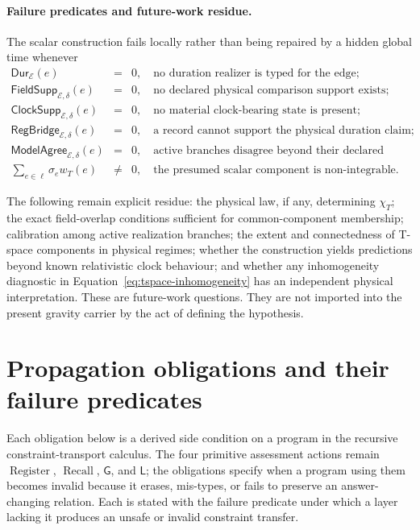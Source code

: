 \documentclass[11pt]{article}
\newcommand{\Register}{\ensuremath{\operatorname{Register}}}
\newcommand{\Recall}{\ensuremath{\operatorname{Recall}}}
\newcommand{\GOp}{\ensuremath{\mathsf{G}}}
\newcommand{\LOp}{\ensuremath{\mathsf{L}}}
\theoremstyle{definition}
\begin{document}
\paragraph{Failure predicates and future-work residue.}
The scalar construction fails locally rather than being repaired by a hidden global
time whenever
\begin{equation}
\begin{array}{rcl}
\mathsf{Dur}_{\mathcal E}(e)&=&0,\quad\text{no duration realizer is typed for the edge;}\\
\mathsf{FieldSupp}_{\mathcal E,\delta}(e)&=&0,\quad\text{no declared physical comparison support exists;}\\
\mathsf{ClockSupp}_{\mathcal E,\delta}(e)&=&0,\quad\text{no material clock-bearing state is present;}\\
\mathsf{RegBridge}_{\mathcal E,\delta}(e)&=&0,\quad\text{a record cannot support the physical duration claim;}\\
\mathsf{ModelAgree}_{\mathcal E,\delta}(e)&=&0,\quad\text{active branches disagree beyond their declared allowance;}\\
\sum_{e\in\ell}\sigma_e w_T(e)&\neq&0,\quad\text{the presumed scalar component is non-integrable.}
\end{array}
\label{eq:tspace-failure-predicates}
\end{equation}

The following remain explicit residue: the physical law, if any, determining
$\chi_T$; the exact field-overlap conditions sufficient for common-component
membership; calibration among active realization branches; the extent and
connectedness of T-space components in physical regimes; whether the construction
yields predictions beyond known relativistic clock behaviour; and whether any
inhomogeneity diagnostic in Equation~\eqref{eq:tspace-inhomogeneity} has an
independent physical interpretation. These are future-work questions. They are
not imported into the present gravity carrier by the act of defining the hypothesis.

\section{Propagation obligations and their failure predicates}
\label{supp:obligations}

Each obligation below is a derived side condition on a program in the recursive
constraint-transport calculus. The four primitive assessment actions remain
$\Register$, $\Recall$, $\GOp$, and $\LOp$; the obligations specify when a program
using them becomes invalid because it erases, mis-types, or fails to preserve an
answer-changing relation. Each is stated with the failure predicate under which a
layer lacking it produces an unsafe or invalid constraint transfer.
\end{document}
